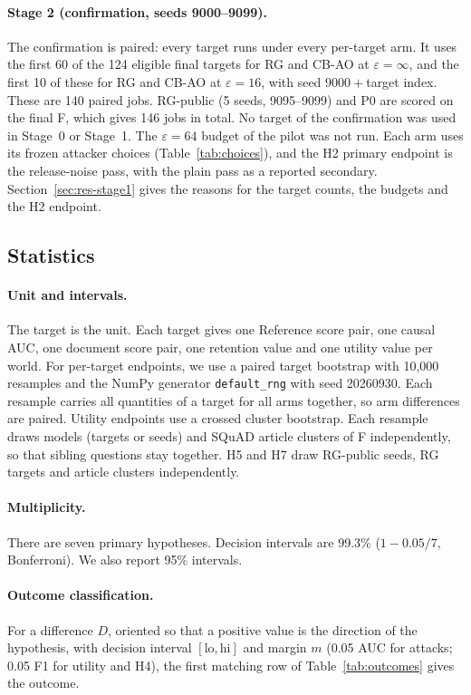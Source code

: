 \documentclass[11pt]{article}
\begin{document}
\paragraph{Stage 2 (confirmation, seeds 9000--9099).} The confirmation is paired: every target runs under every per-target arm. It uses the first 60 of the 124 eligible final targets for RG and CB-AO at $\varepsilon=\infty$, and the first 10 of these for RG and CB-AO at $\varepsilon=16$, with seed $9000+{}$target index. These are 140 paired jobs. RG-public (5 seeds, 9095--9099) and P0 are scored on the final F, which gives 146 jobs in total. No target of the confirmation was used in Stage~0 or Stage~1. The $\varepsilon=64$ budget of the pilot was not run. Each arm uses its frozen attacker choices (Table~\ref{tab:choices}), and the H2 primary endpoint is the release-noise pass, with the plain pass as a reported secondary. Section~\ref{sec:res-stage1} gives the reasons for the target counts, the budgets and the H2 endpoint.

\subsection{Statistics}\label{sec:stats}

\paragraph{Unit and intervals.} The target is the unit. Each target gives one Reference score pair, one causal AUC, one document score pair, one retention value and one utility value per world. For per-target endpoints, we use a paired target bootstrap with 10{,}000 resamples and the NumPy generator \texttt{default\_rng} with seed 20260930. Each resample carries all quantities of a target for all arms together, so arm differences are paired. Utility endpoints use a crossed cluster bootstrap. Each resample draws models (targets or seeds) and SQuAD article clusters of F independently, so that sibling questions stay together. H5 and H7 draw RG-public seeds, RG targets and article clusters independently.

\paragraph{Multiplicity.} There are seven primary hypotheses. Decision intervals are 99.3\% ($1-0.05/7$, Bonferroni). We also report 95\% intervals.

\paragraph{Outcome classification.} For a difference $D$, oriented so that a positive value is the direction of the hypothesis, with decision interval $[\mathrm{lo},\mathrm{hi}]$ and margin $m$ (0.05 AUC for attacks; 0.05 F1 for utility and H4), the first matching row of Table~\ref{tab:outcomes} gives the outcome.
\end{document}
